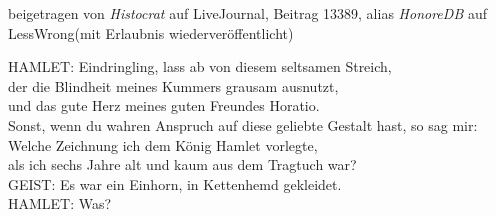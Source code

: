 {beigetragen von \emph{Histocrat} auf LiveJournal, Beitrag 13389, alias \emph{HonoreDB} auf LessWrong(mit Erlaubnis wiederveröffentlicht)




\begin{playdialog}%
HAMLET: Eindringling, lass ab von diesem seltsamen Streich,\\
der die Blindheit meines Kummers grausam ausnutzt,\\
und das gute Herz meines guten Freundes Horatio.\\
Sonst, wenn du wahren Anspruch auf diese geliebte Gestalt hast, so sag mir:\\
Welche Zeichnung ich dem König Hamlet vorlegte,\\
als ich sechs Jahre alt und kaum aus dem Tragtuch war?\\

GEIST: Es war ein Einhorn, in Kettenhemd gekleidet.\\

HAMLET: Was?\\


\end{playdialog}}
